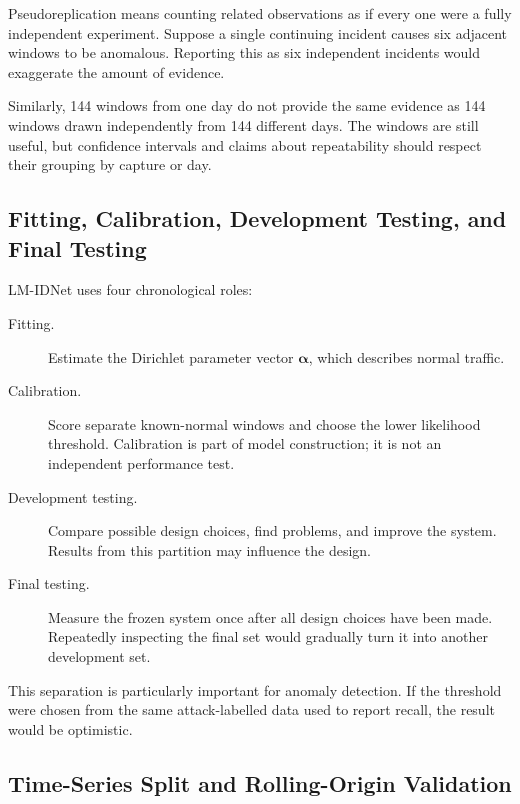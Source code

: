 \documentclass[11pt,a4paper]{article}
\begin{document}
Pseudoreplication means counting related observations as if every one were a
fully independent experiment. Suppose a single continuing incident causes six
adjacent windows to be anomalous. Reporting this as six independent incidents
would exaggerate the amount of evidence.

Similarly, 144 windows from one day do not provide the same evidence as 144
windows drawn independently from 144 different days. The windows are still
useful, but confidence intervals and claims about repeatability should respect
their grouping by capture or day.

\subsection{Fitting, Calibration, Development Testing, and Final Testing}

LM-IDNet uses four chronological roles:

\begin{description}

\item[Fitting.] Estimate the Dirichlet parameter vector
\(\boldsymbol{\alpha}\), which describes normal traffic.

\item[Calibration.] Score separate known-normal windows and choose the lower
likelihood threshold. Calibration is part of model construction; it is not an
independent performance test.

\item[Development testing.] Compare possible design choices, find problems,
and improve the system. Results from this partition may influence the design.

\item[Final testing.] Measure the frozen system once after all design choices
have been made. Repeatedly inspecting the final set would gradually turn it
into another development set.

\end{description}

This separation is particularly important for anomaly detection. If the
threshold were chosen from the same attack-labelled data used to report recall,
the result would be optimistic.

\subsection{Time-Series Split and Rolling-Origin Validation}
\end{document}
